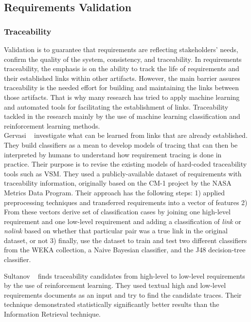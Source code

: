 \subsection{Requirements Validation}

\subsubsection{Traceability}

Validation is to guarantee that requirements are reflecting stakeholders' needs,
confirm the quality of the system, consistency, and traceability.
In requirements traceability, the emphasis is on the ability to track the life of
requirements and their established links within other artifacts. However, the
main barrier assures traceability is the needed effort for building and
maintaining the links between those artifacts. That is why many research has
tried to apply machine learning and automated tools for facilitating the
establishment of links\cite{Gervasi:2011}.
Traceability tackled in the research mainly by the use of machine learning
classification and reinforcement learning methods.\\

Gervasi \etal~\cite{Gervasi:2011} investigate what can be learned from links that are already established. They build classifiers as a mean to develop models of tracing that can then be interpreted by humans to understand how requirement tracing is done in practice. Their purpose is to revise the existing models of hard-coded traceability tools such as VSM. They used a publicly-available dataset of requirements with traceability information, originally based on the CM-1 project by the NASA Metrics Data Program. Their approach has the following steps: 1) applied preprocessing techniques and transferred requirements into a vector of features 2) From these vectors derive set of classification cases by joining one high-level requirement and one low-level requirement and adding a classification of \textit{link} or \textit{nolink} based on whether that particular pair was a true link in the original dataset, or not 3) finally, use the dataset to train and test two different classifiers from the WEKA collection, a Naive Bayesian classifier, and the J48 decision-tree classifier.\newline

Sultanov \etal~\cite{Sultanov:2013} finds traceability candidates from
high-level to low-level requirements by the use of reinforcement
learning. They used textual high and low-level requirements documents as an input and try to
find the candidate traces. Their technique demonstrated statistically
significantly better results than the Information Retrieval technique.





